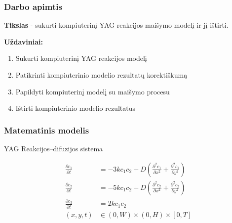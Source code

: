 \documentclass{beamer}
\begin{document}
\begin{frame}
\frametitle{Darbo apimtis}
\textbf{Tikslas} - sukurti kompiuterinį YAG reakcijos maišymo modelį ir jį ištirti.

\textbf{Uždaviniai:}
\begin{enumerate}
\item Sukurti kompiuterinį YAG reakcijos modelį
\item Patikrinti kompiuterinio modelio rezultatų korektiškumą
\item Papildyti kompiuterinį modelį su maišymo procesu
\item Ištirti kompiuterinio modelio rezultatus
\end{enumerate}

\end{frame}

\begin{frame}
\frametitle{Matematinis modelis}

YAG Reakcijos--difuzijos sistema

\begin{align*}
    \frac{\partial c_1}{\partial t} & =-3kc_1c_2+D\left(\frac{\partial^2c_1}{\partial x^2}+\frac{\partial^2c_1}{\partial y^2}\right) \\
    \frac{\partial c_2}{\partial t} & =-5kc_1c_2+D\left(\frac{\partial^2c_2}{\partial x^2}+\frac{\partial^2c_2}{\partial y^2}\right)\\
    \frac{\partial c_3}{\partial t} & =2kc_1c_2\\
    (x, y, t)&\in(0, W)\times(0, H)\times[0, T]
\end{align*}

\end{frame}
\end{document}
